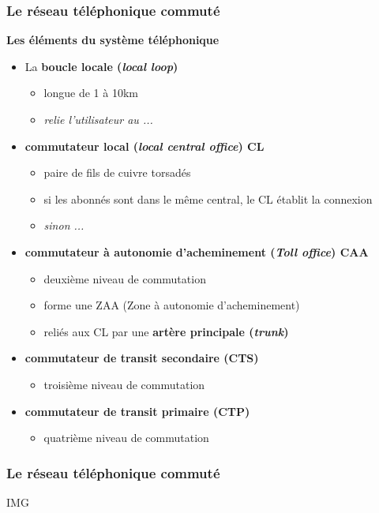 \begin{frame}[fragile]
  \frametitle{Le réseau téléphonique commuté}
{\large\bf Les éléments du système téléphonique}
\begin{itemize}
	\item La \textbf{boucle locale (\textit{local loop})}
	\begin{itemize}
		\item longue de 1 à 10km
		\item \textit{relie l'utilisateur au ...}
	\end{itemize}
	\item \textbf{commutateur local (\textit{local central office}) CL}
	\begin{itemize}
		\item paire de fils de cuivre torsadés
		\item si les abonnés sont dans le même central, le CL établit la connexion
		\item \textit{sinon ...}
	\end{itemize}
	\item \textbf{commutateur à autonomie d'acheminement (\textit{Toll office}) CAA}
	\begin{itemize}
		\item deuxième niveau de commutation
		\item forme une ZAA (Zone à autonomie d'acheminement)
		\item reliés aux CL par une \textbf{artère principale (\textit{trunk})}
	\end{itemize}
	\item \textbf{commutateur de transit secondaire (CTS)}
	\begin{itemize}
		\item troisième niveau de commutation
	\end{itemize}
	\item \textbf{commutateur de transit primaire (CTP)}
	\begin{itemize}
		\item quatrième niveau de commutation
	\end{itemize}
\end{itemize}
\end{frame}

\begin{frame}[fragile]
  \frametitle{Le réseau téléphonique commuté}
\begin{center}
	IMG
\end{center}
\end{frame}


